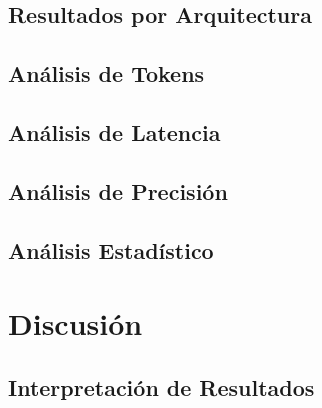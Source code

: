 \documentclass[runningheads]{llncs}
\begin{document}
\subsection{Resultados por Arquitectura}
\label{sec:results-arch}

\subsection{An\'alisis de Tokens}
\label{sec:results-tokens}

\subsection{An\'alisis de Latencia}
\label{sec:results-latency}

\subsection{An\'alisis de Precisi\'on}
\label{sec:results-precision}

\subsection{An\'alisis Estad\'istico}
\label{sec:results-stats}

%
\section{Discusi\'on}
\label{sec:discussion}

\subsection{Interpretaci\'on de Resultados}
\label{sec:interpretation}
\end{document}
